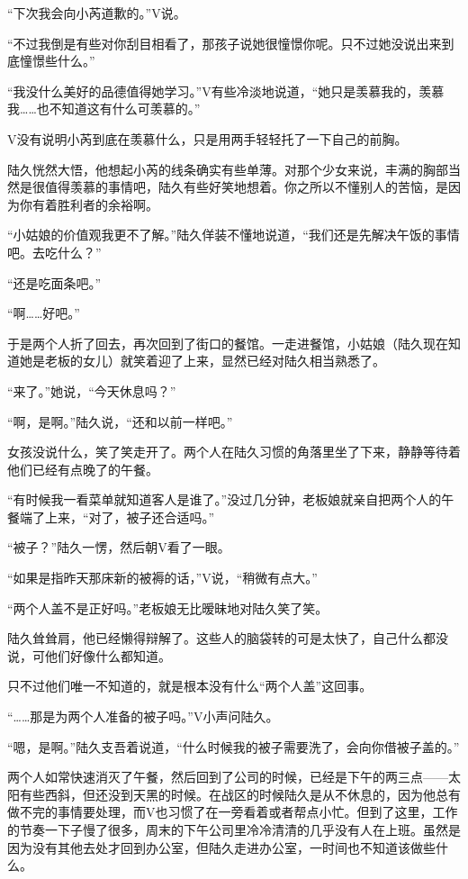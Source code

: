 “下次我会向小芮道歉的。”V说。

“不过我倒是有些对你刮目相看了，那孩子说她很憧憬你呢。只不过她没说出来到底憧憬些什么。”

“我没什么美好的品德值得她学习。”V有些冷淡地说道，“她只是羡慕我的，羡慕我……也不知道这有什么可羡慕的。”

V没有说明小芮到底在羡慕什么，只是用两手轻轻托了一下自己的前胸。

陆久恍然大悟，他想起小芮的线条确实有些单薄。对那个少女来说，丰满的胸部当然是很值得羡慕的事情吧，陆久有些好笑地想着。你之所以不懂别人的苦恼，是因为你有着胜利者的余裕啊。

“小姑娘的价值观我更不了解。”陆久佯装不懂地说道，“我们还是先解决午饭的事情吧。去吃什么？”

“还是吃面条吧。”

“啊……好吧。” 

于是两个人折了回去，再次回到了街口的餐馆。一走进餐馆，小姑娘（陆久现在知道她是老板的女儿）就笑着迎了上来，显然已经对陆久相当熟悉了。

“来了。”她说，“今天休息吗？”

“啊，是啊。”陆久说，“还和以前一样吧。”

女孩没说什么，笑了笑走开了。两个人在陆久习惯的角落里坐了下来，静静等待着他们已经有点晚了的午餐。

“有时候我一看菜单就知道客人是谁了。”没过几分钟，老板娘就亲自把两个人的午餐端了上来，“对了，被子还合适吗。”

“被子？”陆久一愣，然后朝V看了一眼。

“如果是指昨天那床新的被褥的话，”V说，“稍微有点大。”

“两个人盖不是正好吗。”老板娘无比暧昧地对陆久笑了笑。

陆久耸耸肩，他已经懒得辩解了。这些人的脑袋转的可是太快了，自己什么都没说，可他们好像什么都知道。

只不过他们唯一不知道的，就是根本没有什么“两个人盖”这回事。

“……那是为两个人准备的被子吗。”V小声问陆久。

“嗯，是啊。”陆久支吾着说道，“什么时候我的被子需要洗了，会向你借被子盖的。”



两个人如常快速消灭了午餐，然后回到了公司的时候，已经是下午的两三点——太阳有些西斜，但还没到天黑的时候。在战区的时候陆久是从不休息的，因为他总有做不完的事情要处理，而V也习惯了在一旁看着或者帮点小忙。但到了这里，工作的节奏一下子慢了很多，周末的下午公司里冷冷清清的几乎没有人在上班。虽然是因为没有其他去处才回到办公室，但陆久走进办公室，一时间也不知道该做些什么。


